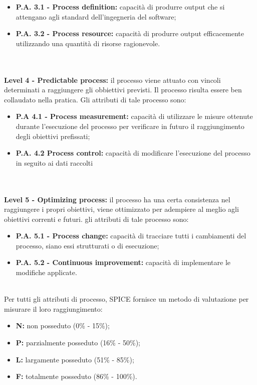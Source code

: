 \begin{itemize}
    \item \textbf{P.A. 3.1 - Process definition:} capacità di produrre output che si attengano agli standard dell'ingegneria del software;
    \item \textbf{P.A. 3.2 - Process resource:} capacità di produrre output efficacemente utilizzando una quantità di risorse ragionevole.
\end{itemize}
\\\\
\textbf{Level 4 - Predictable process:} il processo viene attuato con vincoli determinati a raggiungere gli obbiettivi previsti. Il processo risulta essere ben collaudato nella pratica. Gli attributi di tale processo sono:
\begin{itemize}
    \item \textbf{P.A 4.1 - Process measurement:} capacità di utilizzare le misure ottenute durante l'esecuzione del processo per verificare in futuro il raggiungimento degli obiettivi prefissati;
    \item \textbf{P.A. 4.2 Process control:} capacità di modificare l'esecuzione del processo in seguito ai dati raccolti
\end{itemize}
\\\\
\textbf{Level 5 - Optimizing process:} il processo ha una certa consistenza nel raggiungere i propri obiettivi, viene ottimizzato per adempiere al meglio agli obiettivi correnti e futuri. gli attributi di tale processo sono:
\begin{itemize}
    \item \textbf{P.A. 5.1 - Process change:} capacità di tracciare tutti i cambiamenti del processo, siano essi strutturati o di esecuzione;
    \item \textbf{P.A. 5.2 - Continuous improvement:} capacità di implementare le modifiche applicate.
\end{itemize}
\\
Per tutti gli attributi di processo, SPICE fornisce un metodo di valutazione per misurare il loro raggiungimento:
\begin{itemize}
    \item \textbf{N:} non posseduto (0\% - 15\%);
    \item \textbf{P:} parzialmente posseduto (16\% - 50\%);
    \item \textbf{L:} largamente posseduto (51\% - 85\%);
    \item \textbf{F:} totalmente posseduto (86\% - 100\%).
\end{itemize}
